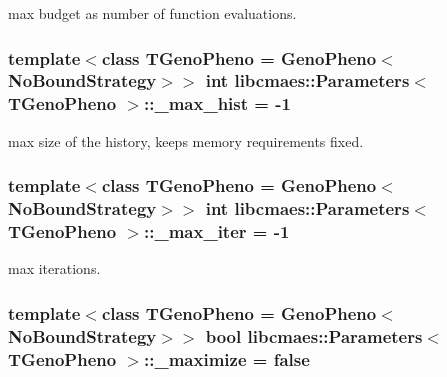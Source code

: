 max budget as number of function evaluations. \hypertarget{classlibcmaes_1_1Parameters_a6ecc091e7e10b30c067f28e5be05faff}{
\subsubsection[{\+\_\+max\+\_\+hist}]{\setlength{\rightskip}{0pt plus 5cm}template$<$class T\+Geno\+Pheno = Geno\+Pheno$<$\+No\+Bound\+Strategy$>$$>$ int {\bf libcmaes\+::\+Parameters}$<$ T\+Geno\+Pheno $>$\+::\+\_\+max\+\_\+hist = -\/1\hspace{0.3cm}{\ttfamily [protected]}}}\label{classlibcmaes_1_1Parameters_a6ecc091e7e10b30c067f28e5be05faff}
max size of the history, keeps memory requirements fixed. \hypertarget{classlibcmaes_1_1Parameters_a60abfc730c5aa46e42ebd1598b59caa6}{
\subsubsection[{\+\_\+max\+\_\+iter}]{\setlength{\rightskip}{0pt plus 5cm}template$<$class T\+Geno\+Pheno = Geno\+Pheno$<$\+No\+Bound\+Strategy$>$$>$ int {\bf libcmaes\+::\+Parameters}$<$ T\+Geno\+Pheno $>$\+::\+\_\+max\+\_\+iter = -\/1\hspace{0.3cm}{\ttfamily [protected]}}}\label{classlibcmaes_1_1Parameters_a60abfc730c5aa46e42ebd1598b59caa6}
max iterations. \hypertarget{classlibcmaes_1_1Parameters_a8c65760fc2d97303d9881c2a945d1d7b}{
\subsubsection[{\+\_\+maximize}]{\setlength{\rightskip}{0pt plus 5cm}template$<$class T\+Geno\+Pheno = Geno\+Pheno$<$\+No\+Bound\+Strategy$>$$>$ bool {\bf libcmaes\+::\+Parameters}$<$ T\+Geno\+Pheno $>$\+::\+\_\+maximize = false\hspace{0.3cm}{\ttfamily [protected]}}}\label{classlibcmaes_1_1Parameters_a8c65760fc2d97303d9881c2a945d1d7b}
